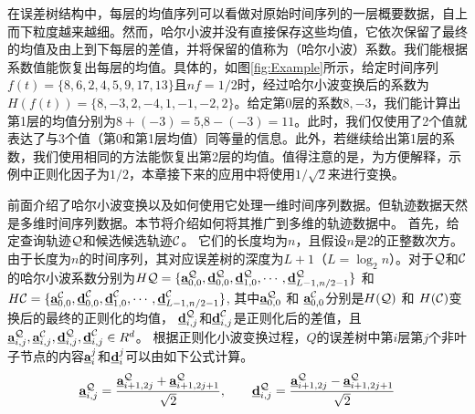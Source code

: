在误差树结构中，每层的均值序列可以看做对原始时间序列的一层概要数据，自上而下粒度越来越细。然而，哈尔小波并没有直接保存这些均值，它依次保留了最终的均值及由上到下每层的差值，并将保留的值称为（哈尔小波）系数。我们能根据系数值能恢复出每层的均值。具体的，如图\ref{fig:Example}所示，给定时间序列$f(t)=\{8,6,2,4,5,9,17,13\}$且$nf=1/2$时，经过哈尔小波变换后的系数为$H(f(t))=\{8,-3,2,-4,1,-1,-2,2\}$。给定第0层的系数$8,-3$，我们能计算出第1层的均值分别为$8+(-3)=5$,$8-(-3)=11$。此时，我们仅使用了2个值就表达了与3个值（第0和第1层均值）同等量的信息。此外，若继续给出第1层的系数，我们使用相同的方法能恢复出第2层的均值。值得注意的是，为方便解释，示例中正则化因子为$1/2$，本章接下来的应用中将使用$1/\sqrt{2}$来进行变换。

 前面介绍了哈尔小波变换以及如何使用它处理一维时间序列数据。但轨迹数据天然是多维时间序列数据。本节将介绍如何将其推广到多维的轨迹数据中。
 首先，给定查询轨迹$\cal Q$和候选候选轨迹$\cal C$。
 它们的长度均为$n$，且假设$n$是2的正整数次方。由于长度为$n$的时间序列，其对应误差树的深度为$L+1$（$L=\log_{2}n$）。对于$\cal Q$和$\cal C$的哈尔小波系数分别为$H{\cal Q}=\{\emph{{\textbf{a}}}_{0,0}^{\cal Q},\emph{{\textbf{d}}}_{0,0}^{\cal Q}, \emph{{\textbf{d}}}_{1,0}^{\cal Q},\cdots,\emph{{\textbf{d}}}_{L-1,n/2-1}^{\cal Q}\}$ 和 $H{\cal C}=\{\emph{{\textbf{a}}}_{0,0}^{\cal C},\emph{{\textbf{d}}}_{0,0}^{\cal C},\emph{{\textbf{d}}}_{1,0}^{\cal C},\cdots,\emph{{\textbf{d}}}_{L-1,n/2-1}^{\cal C}\}$, 
 其中$\emph{{\textbf{a}}}_{0,0}^{\cal Q}$ 和 $\emph{{\textbf{a}}}_{0,0}^{\cal C}$分别是$H({\cal Q})$ 和 $H({\cal C})$变换后的最终的正则化的均值， $\emph{{\textbf{d}}}_{i,j}^{\cal Q}$和$\emph{{\textbf{d}}}_{i,j}^{\cal C}$是正则化后的差值，且$\emph{{\textbf{a}}}_{i,j}^{\cal Q}, \emph{{\textbf{a}}}_{i,j}^{\cal C}, \emph{{\textbf{d}}}_{i,j}^{\cal Q}, \emph{{\textbf{d}}}_{i,j}^{\cal C} \in R^d$。
 根据正则化小波变换过程，$Q$的误差树中第$i$层第$j$个非叶子节点的内容$\emph{{\textbf{a}}}_{i}^{j}$和$\emph{{\textbf{d}}}_{i}^{j}$可以由如下公式计算。
 \begin{eqnarray}
\emph{{\textbf{a}}}_{i,j}^{\cal Q}=\frac{\emph{{\textbf{a}}}_{i+1,2j}^{\cal Q} + \emph{{\textbf{a}}}_{i+1,2j+1}^{\cal Q} }{\sqrt{2}},\qquad \emph{{\textbf{d}}}_{i,j}^{\cal Q}=\frac{\emph{{\textbf{a}}}_{i+1,2j}^{\cal Q} - \emph{{\textbf{a}}}_{i+1,2j+1}^{\cal Q} }{\sqrt{2}}
 \end{eqnarray}
 

